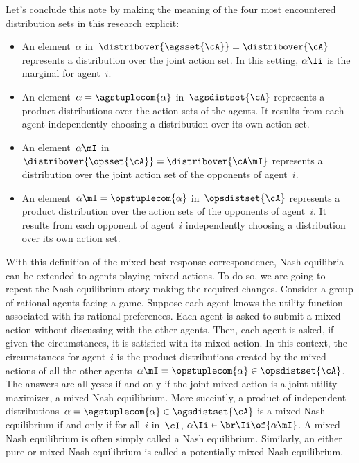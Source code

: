 \begin{note}
Let's conclude this note by making the meaning of the four most encountered distribution sets in this research explicit:
\begin{itemize}
\item An element~\(\alpha\) in~\(\distribover{\agsset{\cA}} = \distribover{\cA}\) represents a distribution over the joint action set.
In this setting, \(\alpha\Ii\) is the marginal for agent~\(i\).
\item An element~\(\alpha = \agstuplecom{\alpha}\) in~\(\agsdistset{\cA}\) represents a product distributions over the action sets of the agents.
It results from each agent independently choosing a distribution over its own action set.
\item An element~\(\alpha\mI\) in~\(\distribover{\opsset{\cA}} = \distribover{\cA\mI}\) represents a distribution over the joint action set of the opponents of agent~\(i\).
\item An element~\(\alpha\mI = \opstuplecom{\alpha}\) in~\(\opsdistset{\cA}\) represents a product distribution over the action sets of the opponents of agent~\(i\).
It results from each opponent of agent~\(i\) independently choosing a distribution over its own action set.
\end{itemize}
\end{note}

With this definition of the mixed best response correspondence, Nash equilibria can be extended to agents playing mixed actions.
To do so, we are going to repeat the Nash equilibrium story making the required changes.
Consider a group of rational agents facing a game.
Suppose each agent knows the utility function associated with its rational preferences.
Each agent is asked to submit a mixed action without discussing with the other agents.
Then, each agent is asked, if given the circumstances, it is satisfied with its mixed action.
In this context, the circumstances for agent~\(i\) is the product distributions created by the mixed actions of all the other agents~\(\alpha\mI = \opstuplecom{\alpha} \in \opsdistset{\cA}\).
The answers are all yeses if and only if the joint mixed action is a joint utility maximizer, \ie a mixed Nash equilibrium.
More succintly, a product of independent distributions~\(\alpha = \agstuplecom{\alpha} \in \agsdistset{\cA}\) is a mixed Nash equilibrium if and only if for all~\(i\) in~\(\cI\), \(\alpha\Ii \in \br\Ii \of {\alpha\mI}\).
A mixed Nash equilibrium is often simply called a Nash equilibrium.
Similarly, an either pure or mixed Nash equilibrium is called a potentially mixed Nash equilibrium.

